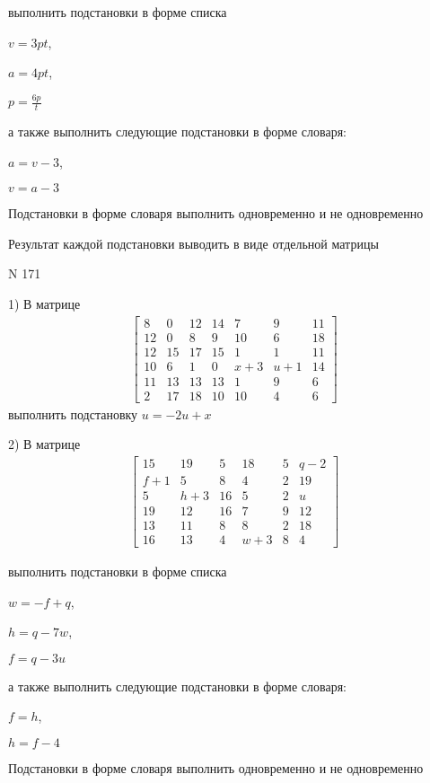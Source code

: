 \documentclass[11pt]{report}
\begin{document}
выполнить подстановки в форме списка

$v=3 p t$,

$a=4 p t$,

$p=\frac{6 p}{t}$

а также выполнить следующие подстановки в форме словаря:

$a=v - 3$,

$v=a - 3$


    Подстановки в форме словаря выполнить одновременно и не одновременно


    Результат каждой подстановки выводить в виде отдельной матрицы

\newpage
N 171


    1) В матрице
\begin{align*}
\left[\begin{matrix}8 & 0 & 12 & 14 & 7 & 9 & 11\\12 & 0 & 8 & 9 & 10 & 6 & 18\\12 & 15 & 17 & 15 & 1 & 1 & 11\\10 & 6 & 1 & 0 & x + 3 & u + 1 & 14\\11 & 13 & 13 & 13 & 1 & 9 & 6\\2 & 17 & 18 & 10 & 10 & 4 & 6\end{matrix}\right]
\end{align*}
выполнить подстановку $u=- 2 u + x$


    2) В матрице
\begin{align*}
\left[\begin{matrix}15 & 19 & 5 & 18 & 5 & q - 2\\f + 1 & 5 & 8 & 4 & 2 & 19\\5 & h + 3 & 16 & 5 & 2 & u\\19 & 12 & 16 & 7 & 9 & 12\\13 & 11 & 8 & 8 & 2 & 18\\16 & 13 & 4 & w + 3 & 8 & 4\end{matrix}\right]
\end{align*}

выполнить подстановки в форме списка

$w=- f + q$,

$h=q - 7 w$,

$f=q - 3 u$

а также выполнить следующие подстановки в форме словаря:

$f=h$,

$h=f - 4$


    Подстановки в форме словаря выполнить одновременно и не одновременно
\end{document}

